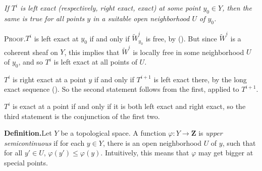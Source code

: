 { \emph{If $T^i$ is left exact (respectively, right exact, exact) at some point $y_0\in Y$, then the same is true for all points $y$ in a suitable open neighborhood $U$ of $y_0$.}

\par\smallskip\noindent\textsc{Proof.}\enspace $T^i$ is left exact at $y_0$ if and only if $\widetilde W^i_{y_0}$ is free, by (). But since $\widetilde W^i$ is a coherent sheaf on $Y$, this implies that $\widetilde W^i$ is locally free in some neighborhood $U$ of $y_0$, and so $T^i$ is left exact at all points of $U$.

$T^i$ is right exact at a point $y$ if and only if $T^{i+1}$ is left exact there, by the long exact sequence (). So the second statement follows from the first, applied to $T^{i+1}$.

$T^i$ is exact at a point if and only if it is both left exact and right exact, so the third statement is the conjunction of the first two.

\par\smallskip\noindent\textbf{Definition.}\enspace Let $Y$ be a topological space. A function $\varphi\colon Y\to\mathbf Z$ is \emph{upper semicontinuous} if for each $y\in Y$, there is an open neighborhood $U$ of $y$, such that for all $y'\in U$, $\varphi(y')\leqslant\varphi(y)$. Intuitively, this means that $\varphi$ may get bigger at special points.
}
